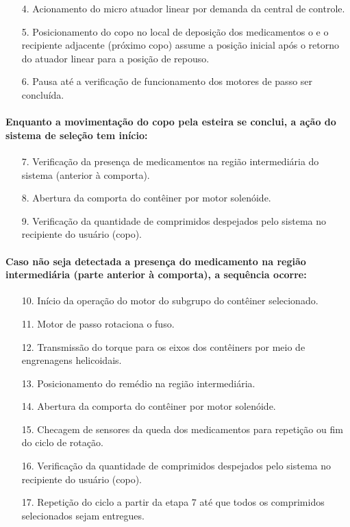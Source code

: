 \begin{enumerate}
    \item [4.] Acionamento do micro atuador linear por demanda da central de controle.
    \item [5.] Posicionamento do copo no local de deposição dos medicamentos o e o recipiente adjacente (próximo copo) assume a posição inicial após o retorno do atuador linear para a posição de repouso.
    \item [6.] Pausa até a verificação de funcionamento dos motores de passo ser concluída.
\end{enumerate}
    
\paragraph*{Enquanto a movimentação do copo pela esteira se conclui, a ação do sistema de seleção tem início:}

\begin{enumerate}
    \item[7.] Verificação da presença de medicamentos na região intermediária do sistema (anterior à comporta).
    \item[8.] Abertura da comporta do contêiner por motor solenóide.
    \item[9.] Verificação da quantidade de comprimidos despejados pelo sistema no recipiente do usuário (copo).
\end{enumerate}
   
\paragraph*{Caso não seja detectada a presença do medicamento na região intermediária (parte  anterior à comporta), a sequência ocorre:}

\begin{enumerate}
    \item[10.] Início da operação do motor do subgrupo do contêiner selecionado.
    \item[11.] Motor de passo rotaciona o fuso.
    \item[12.] Transmissão do torque para os eixos dos contêiners por meio de engrenagens helicoidais.
    \item[13.] Posicionamento do remédio na região intermediária.
    \item[14.] Abertura da comporta do contêiner por motor solenóide.
    \item[15.] Checagem de sensores da queda dos medicamentos para repetição ou fim do ciclo de rotação.
    \item[16.] Verificação da quantidade de comprimidos despejados pelo sistema no recipiente do usuário (copo).
    \item[17.] Repetição do ciclo a partir da etapa 7 até que todos os comprimidos selecionados sejam entregues.
\end{enumerate}


